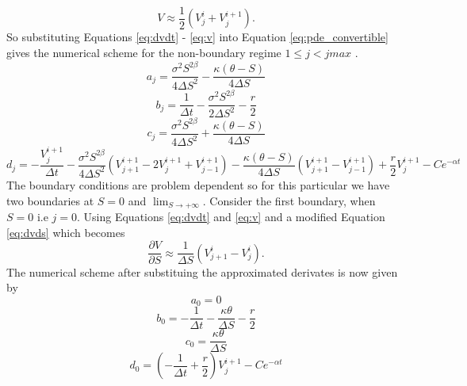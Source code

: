 \documentclass{article}
\begin{document}
\begin{equation}
  V \approx \frac{1}{2}(V_{j}^{i}+{V_{j}^{i+1}}).
  \label{eq:v}
\end{equation}
So substituting Equations \ref{eq:dvdt} - \ref{eq:v} into Equation \ref{eq:pde_convertible} gives the numerical scheme for the non-boundary regime $1 \leq j < jmax$ .
\begin{equation}
  a_j = \frac{\sigma^{2}S^{2\beta}}{4\Delta S^2} - \frac{\kappa(\theta-S)}{4 \Delta S}
  \label{eq:aj}
\end{equation}
\begin{equation}
  b_j = \frac{1}{\Delta t} - \frac{\sigma^2S^{2\beta}}{2 \Delta S^2} - \frac{r}{2}
  \label{eq:bj}
\end{equation}
\begin{equation}
  c_j =\frac{\sigma^{2}S^{2\beta}}{4\Delta S^2} + \frac{\kappa(\theta-S)}{4 \Delta S}
  \label{eq:cj}
\end{equation}
\begin{equation}
  d_j = -\frac{V_{j}^{i+1}}{\Delta t} - \frac{\sigma^2S^{2\beta}}{4 \Delta S^2}(V_{j+1}^{i+1}-2V_{j}^{i+1}+V_{j-1}^{i+1}) - \frac{\kappa(\theta-S)}{4\Delta S}(V_{j+1}^{i+1}-V_{j-1}^{i+1})+\frac{r}{2}V_j^{i+1}-Ce^{-\alpha t}
  \label{eq:dj}
\end{equation}
The boundary conditions are problem dependent so for this particular we have two boundaries at $S=0$ and \({\lim}_{S \to +\infty}\).
Consider the first boundary, when $S=0$ i.e $j=0$. Using Equations \ref{eq:dvdt} and \ref{eq:v} and a modified Equation \ref{eq:dvds} which becomes
\begin{equation}
  \frac{\partial V}{\partial S} \approx \frac{1}{\Delta S}(V_{j+1}^{i}-{V_{j}^i}).
  \label{eq:modified_dvds}
\end{equation}
The numerical scheme after substituing the approximated derivates is now given by
\begin{equation}
  a_0 = 0
  \label{eq:a0}
\end{equation}
\begin{equation}
  b_0 = -\frac{1}{\Delta t} - \frac{\kappa\theta}{\Delta S} - \frac{r}{2}
  \label{eq:b0}
\end{equation}
\begin{equation}
  c_0 =\frac{\kappa\theta}{\Delta S}
  \label{eq:c0}
\end{equation}
\begin{equation}
  d_0 = (-\frac{1}{\Delta t}+\frac{r}{2})V_{j}^{i+1}-Ce^{-\alpha t}
  \label{eq:d0}
\end{equation}
\end{document}
